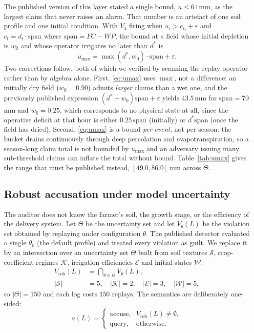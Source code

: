\documentclass[journal]{IEEEtran}
\begin{document}
The published version of this layer stated a single bound, $u\le 61$\,mm, as the
largest claim that never raises an alarm. That number is an artefact of one soil
profile and one initial condition. With $V_4$ firing when $u_i>c_{t_i}+\varepsilon$
and $c_t=d_t\cdot\mathrm{span}$ where $\mathrm{span}=FC-WP$, the bound at a field
whose initial depletion is $w_0$ and whose operator irrigates no later than
$d^{*}$ is
\begin{equation}
u_{\max}=\max(d^{*},w_0)\cdot\mathrm{span}+\varepsilon .
\label{eq:umax}
\end{equation}
Two corrections follow, both of which we verified by scanning the replay operator
rather than by algebra alone. First, \eqref{eq:umax} uses $\max$, not a
difference: an initially dry field ($w_0=0.90$) admits \emph{larger} claims than a
wet one, and the previously published expression $(d^{*}-w_0)\mathrm{span}+\varepsilon$
yields $43.5$\,mm for $\mathrm{span}=70$\,mm and $w_0=0.25$, which corresponds to
no physical state at all, since the operative deficit at that hour is either
$0.25\,\mathrm{span}$ (initially) or $d^{*}\mathrm{span}$ (once the field has
dried). Second, \eqref{eq:umax} is a bound \emph{per event}, not per season: the
bucket drains continuously through deep percolation and evapotranspiration, so a
season-long claim total is not bounded by $u_{\max}$ and an adversary issuing many
sub-threshold claims can inflate the total without bound. Table~\ref{tab:umax}
gives the range that must be published instead, $[49.0,86.0]$\,mm across
$\Theta$.

\subsection{Robust accusation under model uncertainty}
\label{sec:robust}

The auditor does not know the farmer's soil, the growth stage, or the efficiency
of the delivery system. Let $\Theta$ be the uncertainty set and let
$V_\theta(L)$ be the violation set obtained by replaying under configuration
$\theta$. The published detector evaluated a single $\theta_0$ (the default
profile) and treated every violation as guilt. We replace it by an intersection
over an uncertainty set $\Theta$ built from soil textures $\mathcal{S}$,
crop-coefficient regimes $\mathcal{K}$, irrigation efficiencies $\mathcal{E}$
and initial states $\mathcal{W}$:
\begin{equation}
\begin{aligned}
V_{\mathrm{rob}}(L)&=\bigcap_{\theta\in\Theta}V_\theta(L),\\
|\mathcal{S}|&=5,\quad|\mathcal{K}|=2,\quad|\mathcal{E}|=3,\quad
|\mathcal{W}|=5,
\end{aligned}
\label{eq:robust}
\end{equation}
so $|\Theta|=150$ and each log costs $150$ replays. The semantics are
deliberately one-sided:
\begin{equation}
a(L)=
\begin{cases}
\text{accuse}, & V_{\mathrm{rob}}(L)\neq\emptyset,\\
\text{query}, & \text{otherwise}.
\end{cases}
\label{eq:verdict}
\end{equation}
\end{document}
